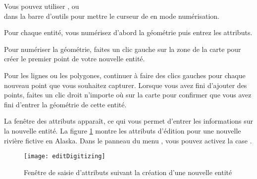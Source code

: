 Vous pouvez utiliser ,  ou\\  dans la barre d'outils pour mettre le curseur de \qg en mode numérisation.

Pour chaque entité, vous numérisez d'abord la géométrie puis entrez les attributs.

Pour numériser la géométrie, faites un clic gauche sur la zone de la carte pour créer le premier point de votre nouvelle entité.

Pour les lignes ou les polygones, continuer à faire des clics gauches pour chaque nouveau point que vous souhaitez capturer. Lorsque vous avez fini d'ajouter des points, faites un clic droit n'importe où sur la carte pour confirmer que vous avez fini d'entrer la géométrie de cette entité.

La fenêtre des attributs apparaît, ce qui vous permet d'entrer les informations sur la nouvelle entité. La figure \ref{fig:vector_digitising} montre les attributs d'édition pour une nouvelle rivière fictive en Alaska. Dans le panneau  du menu  \arrow {}, vous pouvez activez la case .

\begin{figure}[ht]
  \begin{center}
   \texttt{[image: editDigitizing]}
  \caption{Fenêtre de saisie d'attributs suivant la création d'une nouvelle entité \nixcaption}\label{fig:vector_digitising}
\end{center}
\end{figure}

